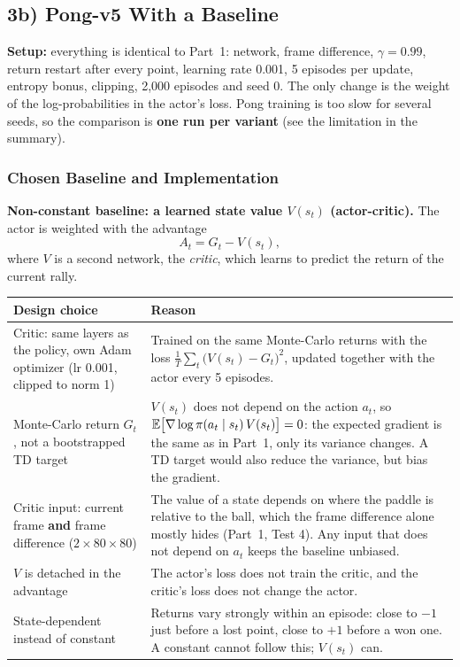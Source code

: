 \FloatBarrier
\subsection{3b) Pong-v5 With a Baseline}

\textbf{Setup:} everything is identical to Part~1: network, frame difference, $\gamma = 0.99$, return restart after every point, learning rate 0.001, 5 episodes per update, entropy bonus, clipping, 2,000 episodes and seed 0. The only change is the weight of the log-probabilities in the actor's loss. Pong training is too slow for several seeds, so the comparison is \textbf{one run per variant} (see the limitation in the summary).

\subsubsection{Chosen Baseline and Implementation}

\textbf{Non-constant baseline: a learned state value $V(s_t)$ (actor-critic).} The actor is weighted with the advantage
\[
  A_t = G_t - V(s_t),
\]
where $V$ is a second network, the \emph{critic}, which learns to predict the return of the current rally.

\begin{center}
\small
\begin{tabularx}{\textwidth}{@{}p{4.2cm}L@{}}
  \toprule
  \textbf{Design choice} & \textbf{Reason} \\
  \midrule
  Critic: same layers as the policy, own Adam optimizer (lr 0.001, clipped to norm 1) & Trained on the same Monte-Carlo returns with the loss $\frac{1}{T}\sum_t \big(V(s_t) - G_t\big)^2$, updated together with the actor every 5 episodes. \\
  Monte-Carlo return $G_t$, not a bootstrapped TD target & $V(s_t)$ does not depend on the action $a_t$, so $\mathbb{E}\big[\nabla \log \pi(a_t \mid s_t)\, V(s_t)\big] = 0$: the expected gradient is the same as in Part~1, only its variance changes. A TD target would also reduce the variance, but bias the gradient. \\
  Critic input: current frame \textbf{and} frame difference ($2 \times 80 \times 80$) & The value of a state depends on where the paddle is relative to the ball, which the frame difference alone mostly hides (Part~1, Test 4). Any input that does not depend on $a_t$ keeps the baseline unbiased. \\
  $V$ is detached in the advantage & The actor's loss does not train the critic, and the critic's loss does not change the actor. \\
  State-dependent instead of constant & Returns vary strongly within an episode: close to $-1$ just before a lost point, close to $+1$ before a won one. A constant cannot follow this; $V(s_t)$ can. \\
  \bottomrule
\end{tabularx}
\end{center}

